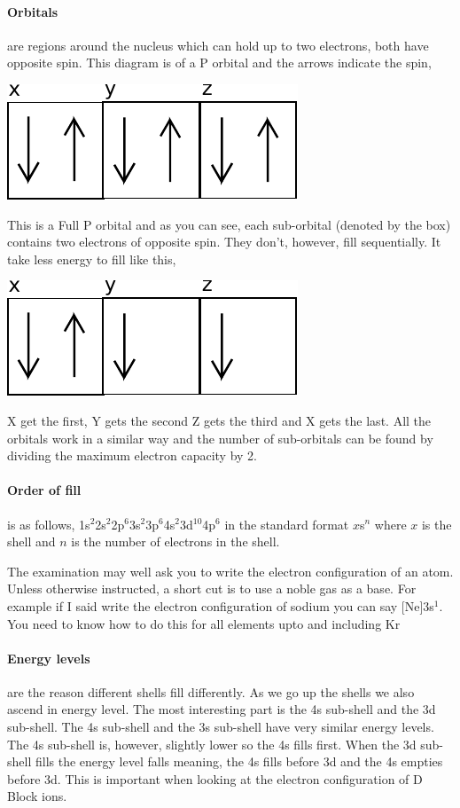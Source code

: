 \documentclass[11pt,a4paper]{memoir}
\begin{document}
	\paragraph{Orbitals} are regions around the nucleus which can hold up to two electrons, both have opposite spin. This diagram is of a P orbital and the arrows indicate the spin,
	\begin{center}
		\includegraphics{Porbital}
	\end{center}
	This is a Full P orbital and as you can see, each sub-orbital (denoted by the box) contains two electrons of opposite spin. They don't, however, fill sequentially. It take less energy to fill like this,
	\begin{center}
		\includegraphics{P4orbital}
	\end{center}
	X get the first, Y gets the second Z gets the third and X gets the last. All the orbitals work in a similar way and the number of sub-orbitals can be found by dividing the maximum electron capacity by 2.
	
	\paragraph{Order of fill} is as follows, 1s$^2$2s$^2$2p$^6$3s$^2$3p$^6$4s$^2$3d$^{10}$4p$^6$ in the standard format $x$s$^n$ where $x$ is the shell and $n$ is the number of electrons in the shell.
	
	The examination may well ask you to write the electron configuration of an atom. Unless otherwise instructed, a short cut is to use a noble gas as a base. For example if I said write the electron configuration of sodium you can say [Ne]3s$^1$. You need to know how to do this for all elements upto and including Kr
	
	\paragraph{Energy levels} are the reason different shells fill differently. As we go up the shells we also ascend in energy level. The most interesting part is the 4s sub-shell and the 3d sub-shell. The 4s sub-shell and the 3s sub-shell have very similar energy levels. The 4s sub-shell is, however, slightly lower so the 4s fills first. When the 3d sub-shell fills the energy level falls meaning, the 4s fills before 3d and the 4s empties before 3d. This is important when looking at the electron configuration of D Block ions.
	
\end{document}
